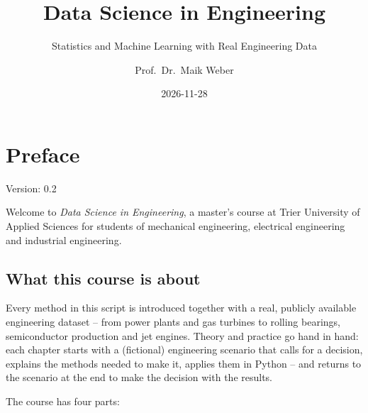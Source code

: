 \documentclass[
  letterpaper,
  DIV=11,
  numbers=noendperiod]{scrreprt}
\title{Data Science in Engineering}
\subtitle{Statistics and Machine Learning with Real Engineering Data}
\author{Prof.~Dr.~Maik Weber}
\date{2026-11-28}
\renewcommand*\contentsname{Table of contents}
\newcommand\contentsname{Table of contents}
\begin{document}
\maketitle

\renewcommand*\contentsname{Table of contents}
{
\hypersetup{linkcolor=}
\setcounter{tocdepth}{2}
\tableofcontents
}


\chapter*{Preface}\label{preface}


Version: 0.2

Welcome to \emph{Data Science in Engineering}, a master's course at
Trier University of Applied Sciences for students of mechanical
engineering, electrical engineering and industrial engineering.

\section*{What this course is about}\label{what-this-course-is-about}


Every method in this script is introduced together with a real, publicly
available engineering dataset -- from power plants and gas turbines to
rolling bearings, semiconductor production and jet engines. Theory and
practice go hand in hand: each chapter starts with a (fictional)
engineering scenario that calls for a decision, explains the methods
needed to make it, applies them in Python -- and returns to the scenario
at the end to make the decision with the results.

The course has four parts:
\end{document}
